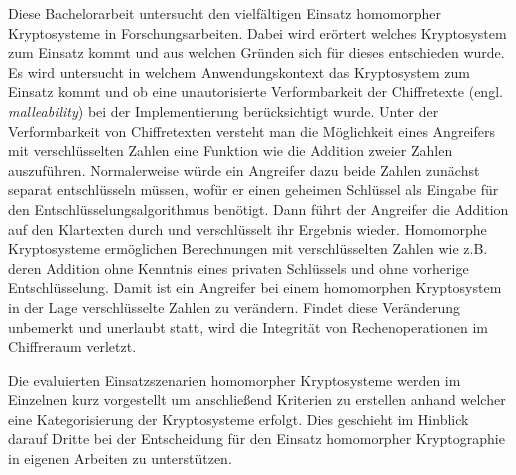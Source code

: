 Diese Bachelorarbeit untersucht den vielfältigen Einsatz homomorpher Kryptosysteme in Forschungsarbeiten. Dabei wird erörtert welches Kryptosystem zum Einsatz kommt und aus welchen Gründen sich für dieses entschieden wurde. Es wird untersucht in welchem Anwendungskontext das Kryptosystem zum Einsatz kommt und ob eine unautorisierte Verformbarkeit der Chiffretexte (engl. \textit{malleability}) bei der Implementierung berücksichtigt wurde. Unter der Verformbarkeit von Chiffretexten versteht man die Möglichkeit eines Angreifers mit verschlüsselten Zahlen eine Funktion wie die Addition zweier Zahlen auszuführen. Normalerweise würde ein Angreifer dazu beide Zahlen zunächst separat entschlüsseln müssen, wofür er einen geheimen Schlüssel als Eingabe für den Entschlüsselungsalgorithmus benötigt. Dann führt der Angreifer die Addition auf den Klartexten durch und verschlüsselt ihr Ergebnis wieder. Homomorphe Kryptosysteme ermöglichen Berechnungen mit verschlüsselten Zahlen wie z.B. deren Addition ohne Kenntnis eines privaten Schlüssels und ohne vorherige Entschlüsselung. Damit ist ein Angreifer bei einem homomorphen Kryptosystem in der Lage verschlüsselte Zahlen zu verändern. Findet diese Veränderung unbemerkt und unerlaubt statt, wird die Integrität von Rechenoperationen im Chiffreraum verletzt.

Die evaluierten Einsatzszenarien homomorpher Kryptosysteme werden im Einzelnen kurz vorgestellt um anschließend Kriterien zu erstellen anhand welcher eine Kategorisierung der Kryptosysteme erfolgt. Dies geschieht im Hinblick darauf Dritte bei der Entscheidung für den Einsatz homomorpher Kryptographie in eigenen Arbeiten zu unterstützen.
 
